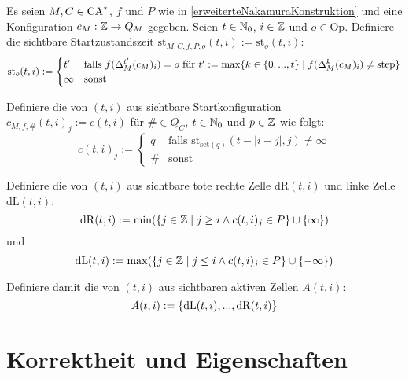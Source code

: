 \begin{definition}
    Es seien $M, C \in \textrm{CA}^*$, $f$ und $P$ wie in \cref{erweiterteNakamuraKonstruktion} und eine Konfiguration $c_M: \mathbb{Z} \to Q_M$ gegeben.
    Seien $t \in \mathbb{N}_0$, $i \in \mathbb{Z}$ und $o \in \mathrm{Op}$.
    Definiere die sichtbare Startzustandszeit $\mathrm{st}_{M, C, f, P, o}(t, i) := \mathrm{st}_o(t, i)$:
    \[
        \mathrm{st}_o(t, i) :=
        \begin{cases}
            t' &
                \text{falls } f(\Delta_M^{t'}(c_M)_i) = o
                \text{ für } t' := \max \{ { k \in \{ {0, ..., t} \} } \; | \; { f(\Delta_M^{k}(c_M)_i) \neq \mathrm{step} } \}
            \\
            \infty & \text{sonst}
        \end{cases}
    \]
    
    Definiere die von $(t, i)$ aus sichtbare Startkonfiguration $c_{M, f, \#}(t, i)_j := c(t, i)$
    für $\# \in Q_C$, $t \in \mathbb{N}_0$ und $p \in \mathbb{Z}$ wie folgt:
    \[
        c(t, i)_j :=
        \begin{cases}
            q & 
                \text{falls } \mathrm{st}_{\mathrm{set}(q)}(t - |i-j|, j) \neq \infty
             \\
            \# & \text{sonst}
        \end{cases}
    \]
    
    Definiere die von $(t, i)$ aus sichtbare tote rechte Zelle $\mathrm{dR}(t, i)$ und linke Zelle $\mathrm{dL}(t, i)$:
    \[
        \mathrm{dR}(t, i) := \min (\{ { j \in \mathbb{Z}} \; | \; {j \geq i \land c(t, i)_j \in P} \} \cup \{ { \infty } \})
    \]
    und
    \[
        \mathrm{dL}(t, i) := \max (\{ { j \in \mathbb{Z}} \; | \; {j \leq i \land c(t, i)_j \in P} \} \cup \{ { -\infty } \})
    \]
    
    Definiere damit die von $(t, i)$ aus sichtbaren aktiven Zellen $A(t, i)$:
    \[
        A(t, i) := \{ { \mathrm{dL}(t, i), ..., \mathrm{dR}(t, i)} \}
    \]
\end{definition}

\section{Korrektheit und Eigenschaften}

